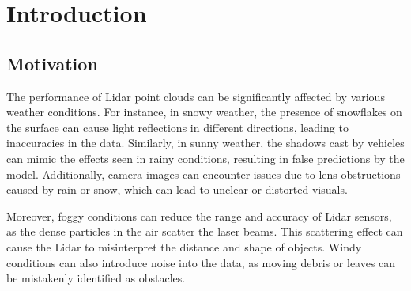 \chapter{Introduction}
\label{chap:intro}

\section{Motivation}
\label{sect:motivation}
The performance of Lidar point clouds can be significantly affected by various weather conditions. For instance, in snowy weather, the presence of snowflakes on the surface can cause light reflections in different directions, leading to inaccuracies in the data. Similarly, in sunny weather, the shadows cast by vehicles can mimic the effects seen in rainy conditions, resulting in false predictions by the model. Additionally, camera images can encounter issues due to lens obstructions caused by rain or snow, which can lead to unclear or distorted visuals.

Moreover, foggy conditions can reduce the range and accuracy of Lidar sensors, as the dense particles in the air scatter the laser beams. This scattering effect can cause the Lidar to misinterpret the distance and shape of objects. Windy conditions can also introduce noise into the data, as moving debris or leaves can be mistakenly identified as obstacles.

